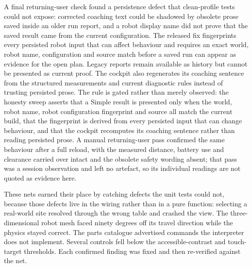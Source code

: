 \documentclass[11pt,a4paper]{report}
\begin{document}
A final returning-user check found a persistence defect that clean-profile tests could not expose: corrected coaching text could be shadowed by obsolete prose saved inside an older run report, and a robot display name did not prove that the saved result came from the current configuration. The released fix fingerprints every persisted robot input that can affect behaviour and requires an exact world, robot name, configuration and source match before a saved run can appear as evidence for the open plan. Legacy reports remain available as history but cannot be presented as current proof. The cockpit also regenerates its coaching sentence from the structured measurements and current diagnostic rules instead of trusting persisted prose. The rule is gated rather than merely observed: the honesty sweep asserts that a Simple result is presented only when the world, robot name, robot configuration fingerprint and source all match the current build, that the fingerprint is derived from every persisted input that can change behaviour, and that the cockpit recomputes its coaching sentence rather than reading persisted prose. A manual returning-user pass confirmed the same behaviour after a full reload, with the measured distance, battery use and clearance carried over intact and the obsolete safety wording absent; that pass was a session observation and left no artefact, so its individual readings are not quoted as evidence here.

These nets earned their place by catching defects the unit tests could not, because those defects live in the wiring rather than in a pure function: selecting a real-world site resolved through the wrong table and crashed the view. The three-dimensional robot mesh faced ninety degrees off its travel direction while the physics stayed correct. The parts catalogue advertised commands the interpreter does not implement. Several controls fell below the accessible-contrast and touch-target thresholds. Each confirmed finding was fixed and then re-verified against the net.
\end{document}
